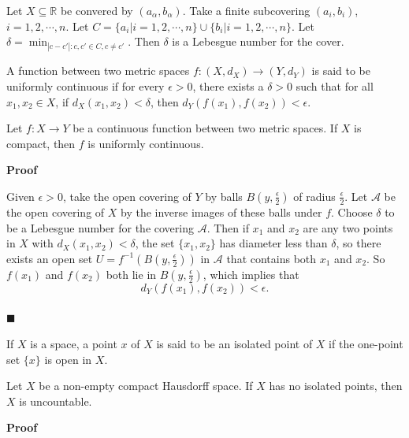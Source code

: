 \documentclass[main.tex]{subfiles}
\begin{document}
\begin{example}
    [Corrected]
    Let $X \subseteq \mathbb{R}$ be convered by $(a_{\alpha}, b_{\alpha})$. Take a finite subcovering $(a_i, b_i)$, $i=1,2,\cdots,n$. Let $C = \{a_i | i = 1, 2, \cdots, n\} \cup \{ b_i | i = 1, 2, \cdots, n\}$. Let $\delta = \min_{ |c - c'|: c, c' \in C, c \neq c'}$. Then $\delta$ is a Lebesgue number for the cover.  
\end{example}

\begin{definition}
    A function between two metric spaces $f: (X, d_X) \to (Y, d_Y)$ is said to be uniformly continuous if for every $\epsilon > 0$, there exists a $\delta > 0$ such that for all $x_1, x_2 \in X$, if $d_X(x_1, x_2) < \delta$, then $d_Y(f(x_1), f(x_2)) < \epsilon$.
\end{definition}

\begin{theorem}
    Let $f: X \rightarrow Y$ be a continuous function between two metric spaces. If $X$ is compact, then $f$ is uniformly continuous.
\end{theorem}
\par \noindent \textbf{Proof} 
\par Given $\epsilon > 0$, take the open covering of $Y$ by balls $B(y, \frac{\epsilon}{2})$ of radius $\frac{\epsilon}{2}$. Let $\mathcal{A}$ be the open covering of $X$ by the inverse images of these balls under $f$. Choose $\delta $ to be a Lebesgue number for the covering $\mathcal{A}$. Then if $x_1$ and $x_2$ are any two points in $X$ with $d_X(x_1, x_2) < \delta$, the set $\{x_1, x_2\}$ has diameter less than $\delta$, so there exists an open set $U = f^{-1}(B(y, \frac{\epsilon}{2}))$ in $\mathcal{A}$ that contains both $x_1$ and $x_2$. So $f(x_1)$ and $f(x_2)$ both lie in $B(y, \frac{\epsilon}{2})$, which implies that
\begin{equation}
    d_Y(f(x_1), f(x_2)) < \epsilon.
\end{equation}
\mbox{} \\ \null \hfill $\blacksquare$ 

\begin{definition}
    If $X$ is a space, a point $x$ of $X$ is said to be an isolated point of $X$ if the one-point set $\{x\}$ is open in $X$.
\end{definition}

\begin{theorem}
    Let $X$ be a non-empty compact Hausdorff space. If $X$ has no isolated points, then $X$ is uncountable.
\end{theorem}
\par \noindent \textbf{Proof} 
\end{document}
